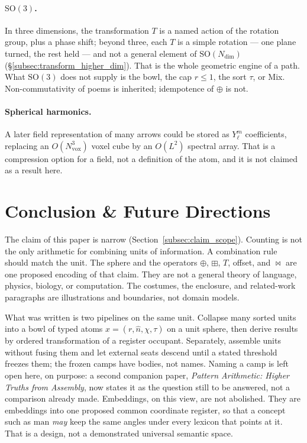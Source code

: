 \documentclass[12pt, a4paper]{article}
\begin{document}
\paragraph{$\mathrm{SO}(3)$.}
In three dimensions, the transformation $T$ is a named action of the
rotation group, plus a phase shift; beyond three, each $T$ is a simple
rotation --- one plane turned, the rest held --- and not a general
element of $\mathrm{SO}(N_{\mathrm{dim}})$
(\S\ref{subsec:transform_higher_dim}). That is the whole geometric engine of a path. What
$\mathrm{SO}(3)$ does not supply is the bowl, the cap $r\le 1$, the
sort $\tau$, or Mix. Non-commutativity of poems is inherited;
idempotence of $\oplus$ is not.

\paragraph{Spherical harmonics.}
A later field representation of many arrows could be stored as
$Y_\ell^m$ coefficients, replacing an $O(N_{\mathrm{vox}}^3)$ voxel cube by an
$O(L^2)$ spectral array. That is a compression option for a field, not
a definition of the atom, and it is not claimed as a result here.

\section{Conclusion \& Future Directions}
\label{sec:conclusion}

The claim of this paper is narrow
(Section~\ref{subsec:claim_scope}). Counting is not the only
arithmetic for combining units of information. A combination rule
should match the unit. The sphere and the operators
$\oplus$, $\boxplus$, $T$, offset, and $\bowtie$ are one proposed
encoding of that claim. They are not a general theory of language,
physics, biology, or computation. The costumes, the enclosure, and
related-work paragraphs are illustrations and boundaries, not domain
models.

What was written is two pipelines on the same unit. Collapse many
sorted units into a bowl of typed atoms $x=(r,\hat n,\chi,\tau)$ on a
unit sphere, then derive results by ordered transformation of a
register occupant. Separately, assemble units without fusing them
and let external seats descend until a stated threshold freezes
them; the frozen camps have bodies, not names. Naming a camp is
left open here, on purpose: a second companion paper,
\emph{Pattern Arithmetic: Higher Truths from Assembly}, now states
it as the question still to be answered, not a comparison already
made.
Embeddings, on this view, are
not abolished. They are embeddings into one proposed common coordinate
register, so that a
concept such as $\mathrm{man}$ \emph{may} keep the same angles under every
lexicon that points at it. That is a design, not a demonstrated
universal semantic space.
\end{document}
